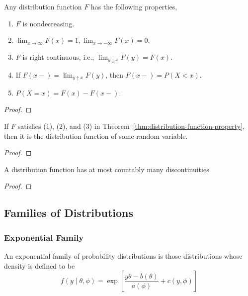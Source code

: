 \begin{theorem}\label{thm:distribution-function-property}
	Any distribution function \(F\) has the following properties,
	\begin{enumerate}
		\item \(F\) is nondecreasing.
		\item \(\lim_{x\rightarrow\infty}F(x)=1,\lim_{x \rightarrow-\infty}F(x)=0\).
		\item \(F\) is right continuous, i.e., \(\lim_{y \downarrow x} F(y)=F(x)\).
		\item If \(F(x-)=\lim_{y\uparrow x}F(y)\), then \(F(x-)=P(X<x)\).
		\item \(P(X=x)=F(x)-F(x-)\).
	\end{enumerate}
\end{theorem}

\begin{proof}

\end{proof}

\begin{theorem}
	If \(F\) satisfies (1), (2), and (3) in Theorem~\ref{thm:distribution-function-property}, then it is the distribution function of some random variable.
\end{theorem}

\begin{proof}

\end{proof}

\begin{theorem}
	A distribution function has at most countably many discontinuities
\end{theorem}

\begin{proof}

\end{proof}

\subsection{Families of Distributions}

\subsubsection{Exponential Family}

\begin{definition}\label{def:exponential-family}
	An exponential family of probability distributions is those distributions whose density is defined to be
	\begin{equation}
		f\left(y\mid\theta,\phi\right)=\exp\left[\frac{y\theta-b(\theta)}{a(\phi)}+c(y,\phi)\right]
	\end{equation}
\end{definition}


